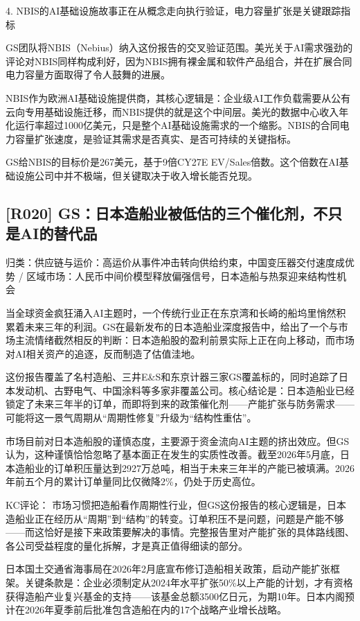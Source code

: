 \documentclass[11pt]{ctexart}
\begin{document}
4. NBIS的AI基础设施故事正在从概念走向执行验证，电力容量扩张是关键跟踪指标

GS团队将NBIS（Nebius）纳入这份报告的交叉验证范围。美光关于AI需求强劲的评论对NBIS同样构成利好，因为NBIS拥有裸金属和软件产品组合，并在扩展合同电力容量方面取得了令人鼓舞的进展。

NBIS作为欧洲AI基础设施提供商，其核心逻辑是：企业级AI工作负载需要从公有云向专用基础设施迁移，而NBIS提供的就是这个中间层。美光的数据中心收入年化运行率超过1000亿美元，只是整个AI基础设施需求的一个缩影。NBIS的合同电力容量扩张速度，是验证其需求是否真实、是否可持续的关键指标。

GS给NBIS的目标价是267美元，基于9倍CY27E EV/Sales倍数。这个倍数在AI基础设施公司中并不极端，但关键取决于收入增长能否兑现。

\subsection{[R020] GS：日本造船业被低估的三个催化剂，不只是AI的替代品}
{\small\color{refgray}归类：供应链与运价：高运价从事件冲击转向供给约束，中国变压器交付速度成优势 / 区域市场：人民币中间价模型释放偏强信号，日本造船与热泵迎来结构性机会}

当全球资金疯狂涌入AI主题时，一个传统行业正在东京湾和长崎的船坞里悄然积累着未来三年的利润。GS在最新发布的日本造船业深度报告中，给出了一个与市场主流情绪截然相反的判断：日本造船股的盈利前景实际上正在向上移动，而市场对AI相关资产的追逐，反而制造了估值洼地。

这份报告覆盖了名村造船、三井E\&S和东京计器三家GS覆盖标的，同时追踪了日本发动机、古野电气、中国涂料等多家非覆盖公司。核心结论是：日本造船业已经锁定了未来三年半的订单，而即将到来的政策催化剂——产能扩张与防务需求——可能将这一景气周期从“周期性修复”升级为“结构性重估”。

市场目前对日本造船股的谨慎态度，主要源于资金流向AI主题的挤出效应。但GS认为，这种谨慎恰恰忽略了基本面正在发生的实质性改善。截至2026年5月底，日本造船业的订单积压量达到2927万总吨，相当于未来三年半的产能已被填满。2026年前五个月的累计订单量同比仅微降2\%，仍处于历史高位。

KC评论： 市场习惯把造船看作周期性行业，但GS这份报告的核心逻辑是，日本造船业正在经历从“周期”到“结构”的转变。订单积压不是问题，问题是产能不够——而这恰好是接下来政策要解决的事情。完整报告里对产能扩张的具体路线图、各公司受益程度的量化拆解，才是真正值得细读的部分。

日本国土交通省海事局在2026年2月底宣布修订造船相关政策，启动产能扩张框架。关键条款是：企业必须制定从2024年水平扩张50\%以上产能的计划，才有资格获得造船产业复兴基金的支持——该基金总额3500亿日元，为期10年。日本内阁预计在2026年夏季前后批准包含造船在内的17个战略产业增长战略。
\end{document}
